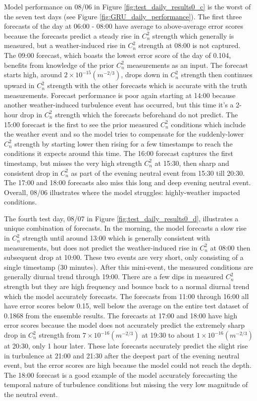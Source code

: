 Model performance on 08/06 in Figure \ref{fig:test_daily_results0_c} is the worst of the seven test days (see Figure \ref{fig:GRU_daily_performance}). The first three forecasts of the day at 06:00 - 08:00 have average to above-average error scores because the forecasts predict a steady rise in $C_{n}^{2}$ strength which generally is measured, but a weather-induced rise in $C_{n}^{2}$ strength at 08:00 is not captured. The 09:00 forecast, which boasts the lowest error score of the day of 0.104, benefits from knowledge of the prior $C_{n}^{2}$ measurements as an input. The forecast starts high, around $2 \times 10^{-15} (m^{-2/3})$, drops down in $C_{n}^{2}$ strength then continues upward in $C_{n}^{2}$ strength with the other forecasts which is accurate with the truth measurements. Forecast performance is poor again starting at 14:00 because another weather-induced turbulence event has occurred, but this time it's a 2-hour drop in $C_{n}^{2}$ strength which the forecasts beforehand do not predict. The 15:00 forecast is the first to see the prior measured $C_{n}^{2}$ conditions which include the weather event and so the model tries to compensate for the suddenly-lower $C_{n}^{2}$ strength by starting lower then rising for a few timestamps to reach the conditions it expects around this time. The 16:00 forecast captures the first timestamp, but misses the very high strength $C_{n}^{2}$ at 15:30, then sharp and consistent drop in $C_{n}^{2}$ as part of the evening neutral event from 15:30 till 20:30. The 17:00 and 18:00 forecasts also miss this long and deep evening neutral event. Overall, 08/06 illustrates where the model struggles: highly-weather impacted conditions.

The fourth test day, 08/07 in Figure \ref{fig:test_daily_results0_d}, illustrates a unique combination of forecasts. In the morning, the model forecasts a slow rise in $C_{n}^{2}$ strength until around 13:00 which is generally consistent with measurements, but does not predict the weather-induced rise in $C_{n}^{2}$ at 08:00 then subsequent drop at 10:00. These two events are very short, only consisting of a single timestamp (30 minutes). After this mini-event, the measured conditions are generally diurnal trend through 19:00. There are a few dips in measured $C_{n}^{2}$ strength but they are high frequency and bounce back to a normal diurnal trend which the model accurately forecasts. The forecasts from 11:00 through 16:00 all have error scores below 0.15, well below the average on the entire test dataset of 0.1868 from the ensemble results. The forecasts at 17:00 and 18:00 have high error scores because the model does not accurately predict the extremely sharp drop in $C_{n}^{2}$ strength from $7 \times 10^{-16} (m^{-2/3})$ at 19:30 to about $1 \times 10^{-16} (m^{-2/3})$ at 20:30, only 1 hour later. These late forecasts accurately predict the slight rise in turbulence at 21:00 and 21:30 after the deepest part of the evening neutral event, but the error scores are high because the model could not reach the depth. The 18:00 forecast is a good example of the model accurately forecasting the temporal nature of turbulence conditions but missing the very low magnitude of the neutral event.

